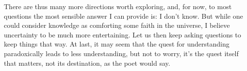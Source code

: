 \documentclass[../thesis.tex]{subfiles}
\begin{document}
There are thus many more directions worth exploring, and, for now, to most questions the
most sensible answer I can provide is: I don't know. But while one could consider
knowledge as comforting some faith in the universe, I believe uncertainty to be much
more entertaining. Let us then keep asking questions to keep things that way.
At last, it may seem that the quest for understanding paradoxically leads to less
understanding, but not to worry,
it's the quest itself that matters, not its destination, as the poet would say.
\end{document}
